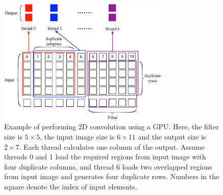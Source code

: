 \begin{figure}[t!]
\centering
  \includegraphics[width=\columnwidth,height=6cm]{./figure/twostrategies.eps}
  \caption{Example of performing 2D convolution using a GPU. Here, the filter size is $5 \times 5$, the input image size is $6 \times 11$
  and the output size is $2 \times 7$. Each thread calculates one column of the output. Assume threads 0 and 1 load the required regions from input
  image with four duplicate columns, and thread 6 loads two overlapped regions from input image and generates four duplicate rows. Numbers in
  the square denote the index of input elements.}
  \label{fig:twostrategies}
\end{figure}
